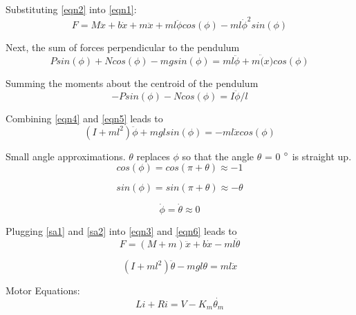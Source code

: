 \documentclass{article}
\begin{document}
Substituting \ref{eqn2} into \ref{eqn1}:
\begin{equation} 
\label{eqn3}
F = M\ddot{x}+b\dot{x} + m\ddot{x}+m l \ddot{\phi} cos(\phi)-m l \dot{\phi}^2sin(\phi)
\end{equation}

Next, the sum of forces perpendicular to the pendulum
\begin{equation} 
\label{eqn4}
Psin(\phi)+Ncos(\phi)-mgsin(\phi) = m l \ddot{\phi} + m\ddot(x)cos(\phi)
\end{equation}

Summing the moments about the centroid of the pendulum
\begin{equation} 
\label{eqn5}
-P sin(\phi)-N cos(\phi) = I \ddot{\phi}/l
\end{equation}

Combining \ref{eqn4} and \ref{eqn5} leads to 
\begin{equation} 
\label{eqn6}
(I+m l^2)\ddot{\phi} + m g lsin(\phi) = -m l \ddot{x} cos(\phi)
\end{equation}

Small angle approximations. $\theta$ replaces $\phi$ so that the angle $\theta$ = 0 $\degree$ is straight up.
\\

\begin{equation} 
\label{sa1}
cos(\phi) = cos(\pi + \theta) \approx -1
\end{equation}

\begin{equation} 
\label{sa2}
sin(\phi) = sin(\pi + \theta) \approx -\theta
\end{equation}

\begin{equation} 
\label{sa3}
\dot{\phi} = \dot{\theta} \approx 0
\end{equation}

Plugging \ref{sa1} and \ref{sa2} into \ref{eqn3} and \ref{eqn6} leads to
\begin{equation} 
\label{eqn3b}
F = (M+m)\ddot{x}+b\dot{x} -m l \ddot{\theta}
\end{equation}

\begin{equation} 
\label{eqn6b}
(I+m l^2)\ddot{\theta} - m g l\theta = m l \ddot{x}
\end{equation}

Motor Equations:
\begin{equation} 
\label{eqn7}
L i + R i = V - K_m\dot{\theta_m}
\end{equation}
\end{document}
